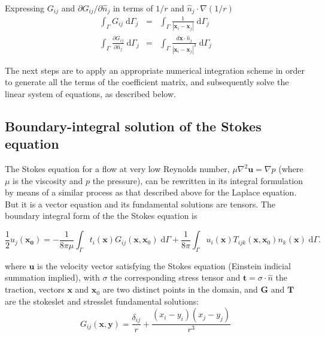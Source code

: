 \documentclass[final,3p,times]{elsarticle}
\newcommand{\di}[1]{\text{d}#1}
\newcommand{\partiald}[2]{\frac{\partial #1}{\partial #2}}
\newcommand{\partialdi}[2]{\partial #1 / \partial #2}
\newcommand{\nhat}{\hat{n}}
\newcommand{\vect}[1]{\mathbf{#1}}
\begin{document}
Expressing $G_{ij}$ and $\partialdi{G_{ij}}{\nhat_j}$ in terms of $1/r$ and $\nhat_j\cdot\nabla(1/r)$
%
\begin{eqnarray}
	\label{eqn:laplace_bem_G}\int_{\Gamma} G_{ij}\;\di{\Gamma_j} & = & \int_{\Gamma} \frac{1}{|\vect{x}_i-\vect{x}_j|} \;\di{\Gamma_j} \\ 
	\label{eqn:laplace_bem_dGdn}\int_{\Gamma} \partiald{G_{ij}}{\nhat_j}\;\di{\Gamma_j} & = & \int_{\Gamma}\frac{d\vect{x}\cdot\nhat_j}{|\vect{x}_i-\vect{x}_j|^{3}}\;\di{\Gamma_j}
\end{eqnarray}

The next steps are to apply an appropriate numerical integration scheme in order to generate all the terms of the coefficient matrix, and subsequently solve the linear system of equations, as described below.

\subsection{Boundary-integral solution of the Stokes equation}

The Stokes equation for a flow at very low Reynolds number, $\mu\nabla^{2}\vect{u} =  \nabla p$ (where $\mu$ is the viscosity and $p$ the pressure), can be rewritten in its integral formulation by means of a similar process as that described above for the Laplace equation. But it is a vector equation and its fundamental solutions are tensors. The boundary integral form of the the Stokes equation is

\begin{equation}
	\label{eqn:stokes_bem_12}
	\frac{1}{2}u_j(\vect{x_0}) = -\frac{1}{8\pi\mu}\int_{\Gamma} t_i(\vect{x})G_{ij}(\vect{x},\vect{x}_0)\;\di{\Gamma} + \frac{1}{8\pi} \int_{\Gamma} u_i(\vect{x})T_{ijk}(\vect{x},\vect{x}_0)n_k(\vect{x})\;\di{\Gamma}.
\end{equation}

\noindent where $\vect{u}$ is the velocity vector satisfying the Stokes equation (Einstein indicial summation implied), with $\sigma$ the corresponding stress tensor and $\vect{t} = \sigma\cdot\nhat$  the traction, vectors $\vect{x}$ and $\vect{x}_0$ are two distinct points in the domain, and $\vect{G}$ and $\vect{T}$ are the stokeslet and stresslet fundamental solutions:
%
\begin{equation}
	\label{eqn:stokeslet}
	G_{ij}(\vect{x},\vect{y})  =  \frac{\delta_{ij}}{r} + \frac{(x_i-y_i)(x_j-y_j)}{r^{3}} 
\end{equation}
\end{document}

